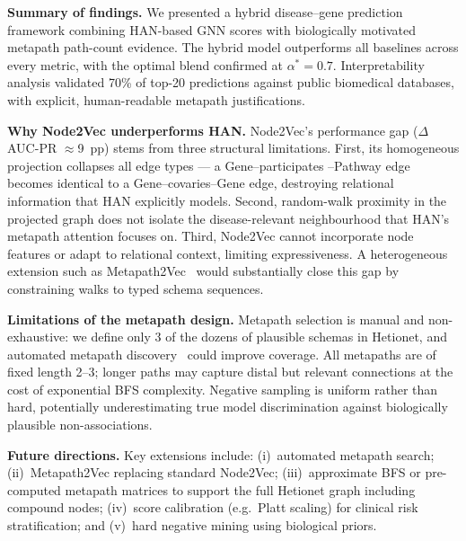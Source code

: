 \documentclass[10pt,a4paper,twocolumn]{article}
\begin{document}
\textbf{Summary of findings.} We presented a hybrid disease--gene prediction
framework combining HAN-based GNN scores with biologically motivated metapath
path-count evidence. The hybrid model outperforms all baselines across every
metric, with the optimal blend confirmed at $\alpha^*=0.7$. Interpretability
analysis validated 70\% of top-20 predictions against public biomedical
databases, with explicit, human-readable metapath justifications.

\textbf{Why Node2Vec underperforms HAN.} Node2Vec's performance gap
($\Delta$AUC-PR $\approx$9~pp) stems from three structural limitations.
First, its homogeneous projection collapses all edge types --- a Gene--participates
--Pathway edge becomes identical to a Gene--covaries--Gene edge, destroying
relational information that HAN explicitly models. Second, random-walk proximity
in the projected graph does not isolate the disease-relevant neighbourhood that
HAN's metapath attention focuses on. Third, Node2Vec cannot incorporate node
features or adapt to relational context, limiting expressiveness. A heterogeneous
extension such as Metapath2Vec~\citep{dong2017metapath2vec} would substantially
close this gap by constraining walks to typed schema sequences.

\textbf{Limitations of the metapath design.} Metapath selection is manual and
non-exhaustive: we define only 3 of the dozens of plausible schemas in Hetionet,
and automated metapath discovery~\citep{yun2019graph} could improve coverage.
All metapaths are of fixed length 2--3; longer paths may capture distal but
relevant connections at the cost of exponential BFS complexity. Negative sampling
is uniform rather than hard, potentially underestimating true model
discrimination against biologically plausible non-associations.

\textbf{Future directions.} Key extensions include: (i)~automated metapath
search; (ii)~Metapath2Vec replacing standard Node2Vec; (iii)~approximate BFS or
pre-computed metapath matrices to support the full Hetionet graph including
compound nodes; (iv)~score calibration (e.g.\ Platt scaling) for clinical risk
stratification; and (v)~hard negative mining using biological priors.
\end{document}
